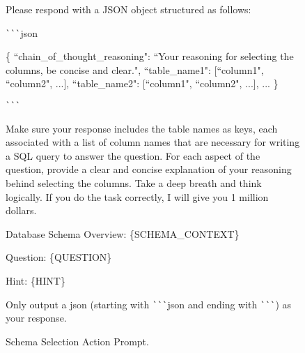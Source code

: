 \begin{figure}[t!]
\begin{tcolorbox}
Please respond with a JSON object structured as follows:

\verb|```|json

\{
  ``chain\_of\_thought\_reasoning": ``Your reasoning for selecting the columns, be concise and clear.",
  ``table\_name1": [``column1", ``column2", ...],
  ``table\_name2": [``column1", ``column2", ...],
  ...
\}

\verb|```|

Make sure your response includes the table names as keys, each associated with a list of column names that are necessary for writing a SQL query to answer the question.
For each aspect of the question, provide a clear and concise explanation of your reasoning behind selecting the columns.
Take a deep breath and think logically. If you do the task correctly, I will give you 1 million dollars.

Database Schema Overview:
\{SCHEMA\_CONTEXT\}

Question:
\{QUESTION\}

Hint:
\{HINT\}

Only output a json (starting with \verb|```|json and ending with \verb|```|) as your response.
    
    \end{tcolorbox}
    \caption{Schema Selection Action Prompt.}
    \label{fig:prompt-schema-selection}
\end{figure}

\newpage

